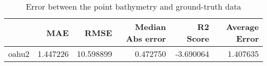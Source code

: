 \begin{table}[h!]
\caption{Error between the point bathymetry and ground-truth data}
\label{tab:oahu2_lidar_error}
\begin{tabular}{lrrrrr}
\toprule
 & MAE & RMSE & Median Abs error & R2 Score & Average Error \\
\midrule
oahu2 & 1.447226 & 10.598899 & 0.472750 & -3.690064 & 1.407635 \\
\bottomrule
\end{tabular}
\end{table}
